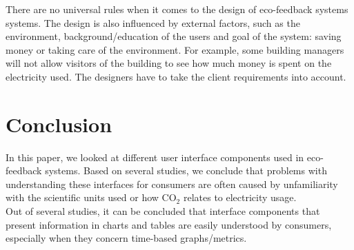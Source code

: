 \documentclass[journal]{vgtc}                %
\begin{document}

There are no universal rules when it comes to the design of eco-feedback systems systems. The design is also influenced by external factors, such as the environment, background/education of the users and goal of the system: saving money or taking care of the environment.
For example, some building managers will not allow visitors of the building to see how much money is spent on the electricity used. The designers have to take the client requirements into account.



%
%
%
%
%


\section{Conclusion}
In this paper, we looked at different user interface components used in eco-feedback systems. Based on several studies, we conclude that problems with understanding these interfaces for consumers are often caused by unfamiliarity with the scientific units used or how CO$_2$ relates to electricity usage. \\

Out of several studies, it can be concluded that interface components that present information in charts and tables are easily understood by consumers, especially when they concern time-based graphs/metrics. \\
\end{document}
